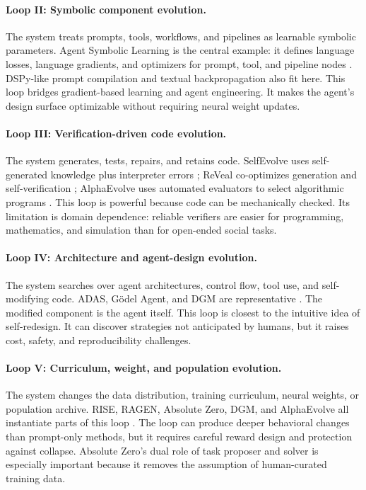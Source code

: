\paragraph{Loop II: Symbolic component evolution.} The system treats prompts, tools, workflows, and pipelines as learnable symbolic parameters. Agent Symbolic Learning is the central example: it defines language losses, language gradients, and optimizers for prompt, tool, and pipeline nodes \cite{agentsymboliclearning2024}. DSPy-like prompt compilation and textual backpropagation also fit here. This loop bridges gradient-based learning and agent engineering. It makes the agent's design surface optimizable without requiring neural weight updates.

\paragraph{Loop III: Verification-driven code evolution.} The system generates, tests, repairs, and retains code. SelfEvolve uses self-generated knowledge plus interpreter errors \cite{selfevolve2023}; ReVeal co-optimizes generation and self-verification \cite{reveal2025}; AlphaEvolve uses automated evaluators to select algorithmic programs \cite{alphaevolve2025}. This loop is powerful because code can be mechanically checked. Its limitation is domain dependence: reliable verifiers are easier for programming, mathematics, and simulation than for open-ended social tasks.

\paragraph{Loop IV: Architecture and agent-design evolution.} The system searches over agent architectures, control flow, tool use, and self-modifying code. ADAS, G{\"o}del Agent, and DGM are representative \cite{adas2025,yin2024godel,darwingodelmachine2025}. The modified component is the agent itself. This loop is closest to the intuitive idea of self-redesign. It can discover strategies not anticipated by humans, but it raises cost, safety, and reproducibility challenges.

\paragraph{Loop V: Curriculum, weight, and population evolution.} The system changes the data distribution, training curriculum, neural weights, or population archive. RISE, RAGEN, Absolute Zero, DGM, and AlphaEvolve all instantiate parts of this loop \cite{qu2024rise,wang2025ragen,absolutezero2025,darwingodelmachine2025,alphaevolve2025}. The loop can produce deeper behavioral changes than prompt-only methods, but it requires careful reward design and protection against collapse. Absolute Zero's dual role of task proposer and solver is especially important because it removes the assumption of human-curated training data.

